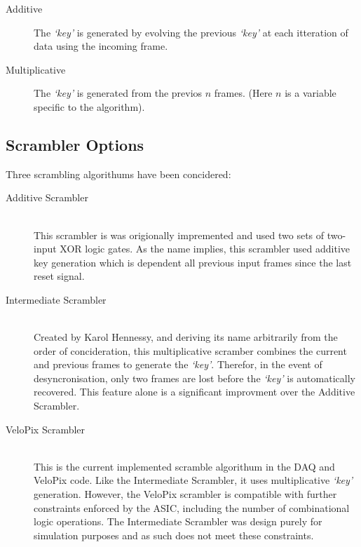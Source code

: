 	\begin{description}
		\item[Additive] The \textit{`key'} is generated by evolving the previous \textit{`key'} at each itteration of data using the incoming frame.
		\item[Multiplicative] The  \textit{`key'} is generated from the previos $n$ frames. (Here $n$ is a variable specific to the algorithm).
	\end{description}

	\subsection{Scrambler Options}
	\label{sub:scrambler_options}

		Three scrambling algorithums have been concidered:

		\begin{description}
			\item[Additive Scrambler] \hfill \\
				This scrambler is was origionally impremented and used two sets of two-input XOR logic gates.
				As the name implies, this scrambler used additive key generation which is dependent all previous input frames since the last reset signal.

			\item[Intermediate Scrambler] \hfill \\
				Created by Karol Hennessy, and deriving its name arbitrarily from the order of concideration, this multiplicative scramber combines the current and previous frames to generate the \textit{`key'}.
				Therefor, in the event of desyncronisation, only two frames are lost before the \textit{`key'} is automatically recovered.
				This feature alone is a significant improvment over the Additive Scrambler.

			\item[VeloPix Scrambler] \hfill \\
				This is the current implemented scramble algorithum in the DAQ and VeloPix code.
				Like the Intermediate Scrambler, it uses multiplicative \textit{`key'} generation.
				However, the VeloPix scrambler is compatible with further constraints enforced by the ASIC, including the number of combinational logic operations.
				The Intermediate Scrambler was design purely for simulation purposes and as such does not meet these constraints.
		\end{description}


